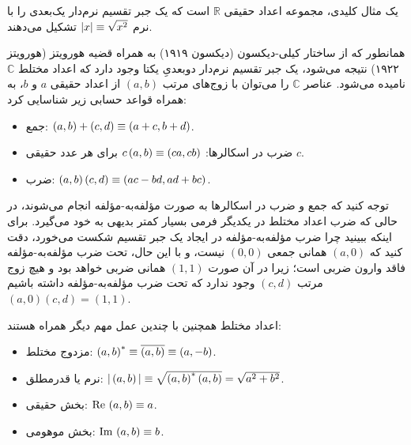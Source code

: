 \documentclass{article}
\begin{document}
یک مثال کلیدی، مجموعه اعداد حقیقی $\mathbb{R}$ است که یک جبر تقسیم نرم‌دار یک‌بعدی را با نرم $\vert x\vert\equiv\sqrt{x^{2}}$ تشکیل می‌دهند.

همانطور که از ساختار کیلی-دیکسون (دیکسون ۱۹۱۹)\nocite{Dickson:1919oqatgathotest} به همراه قضیه هورویتز (هورویتز ۱۹۲۲)\nocite{Hurwitz:1922udkdqf} نتیجه می‌شود، یک جبر تقسیم نرم‌دار دوبعدیِ یکتا وجود دارد که اعداد مختلط $\mathbb{C}$ نامیده می‌شود. عناصر $\mathbb{C}$ را می‌توان با زوج‌های مرتب $\left(a,b\right)$ از اعداد حقیقی $a$ و $b$، به همراه قواعد حسابی زیر شناسایی کرد:
\begin{itemize}
\item جمع: $\left(a,b\right)+\left(c,d\right)\equiv\left(a+c,b+d\right)$.
\item ضرب در اسکالرها: $c\left(a,b\right)\equiv\left(ca,cb\right)$
برای هر عدد حقیقی $c$.
\item ضرب: $\left(a,b\right)\left(c,d\right)\equiv\left(ac-bd,ad+bc\right)$.
\end{itemize}
توجه کنید که جمع و ضرب در اسکالرها به صورت مؤلفه‌به-مؤلفه  انجام می‌شوند، در حالی که ضرب اعداد مختلط در یکدیگر فرمی بسیار کمتر بدیهی به خود می‌گیرد. برای اینکه ببینید چرا ضرب مؤلفه‌به-مؤلفه در ایجاد یک جبر تقسیم شکست می‌خورد، دقت کنید که $\left(a,0\right)$ همانی جمعی $\left(0,0\right)$ نیست، و با این حال، تحت ضرب مؤلفه‌به-مؤلفه فاقد وارون ضربی است؛ زیرا در آن صورت $\left(1,1\right)$ همانی ضربی خواهد بود و هیچ زوج مرتب $\left(c,d\right)$ وجود ندارد که تحت ضرب مؤلفه‌به-مؤلفه داشته باشیم $\left(a,0\right)\left(c,d\right)=\left(1,1\right)$.

اعداد مختلط همچنین با چندین عمل مهم دیگر همراه هستند:
\begin{itemize}
\item مزدوج مختلط: $\left(a,b\right)^{\ast}\equiv\overline{\left(a,b\right)}\equiv\left(a,-b\right)$.
\item نرم یا قدرمطلق: $\vert\left(a,b\right)\vert\equiv\sqrt{\left(a,b\right)^{\ast}\left(a,b\right)}=\sqrt{a^{2}+b^{2}}$.
\item بخش حقیقی: $\mathrm{Re\,}\left(a,b\right)\equiv a$.
\item بخش موهومی: $\mathrm{Im\,}\left(a,b\right)\equiv b$.
\end{itemize}
\end{document}
